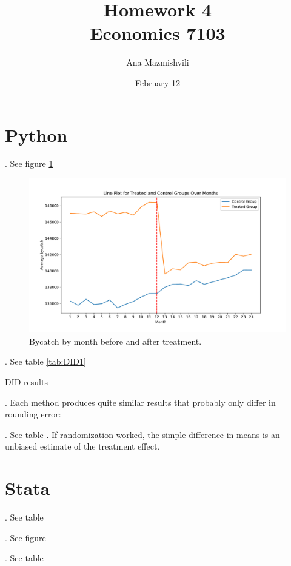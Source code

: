 \documentclass{article}
\title{Homework 4 \\ Economics 7103}
\author{Ana Mazmishvili}
\date{February 12}
\begin{document}
  
\maketitle

\section{Python}

. See figure \ref{fig:trend}

\begin{figure}[h]
    \centering
    \includegraphics{homework 4/output/figure/trend1.pdf}
    \caption{ Bycatch by month before and after treatment. }
    \label{fig:trend}
\end{figure}

. See table \ref{tab:DID1}

\begin{table}[]
    \centering
    
    \caption{DID results}
    \label{tab:DID1}
\end{table}


. Each method produces quite similar results that probably only differ in rounding error:

. See table .  If randomization worked, the simple difference-in-means is an unbiased estimate of the treatment effect.
\section{Stata}

. See table 



. See figure 



. See table 
\end{document}
